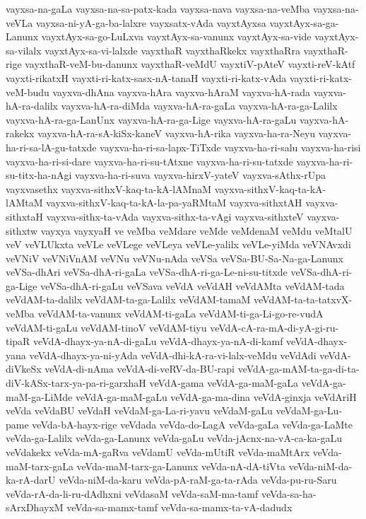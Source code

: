 {vayxsa-na-gaLa
vayxsa-na-sa-patx-kada
vayxsa-nava
vayxsa-na-veMba
vayxsa-na-veVLa
vayxsa-ni-yA-ga-ba-lalxre
vayxsatx-vAda
vayxtAyxsa
vayxtAyx-sa-ga-Lanunx
vayxtAyx-sa-go-LuLxva
vayxtAyx-sa-vanunx
vayxtAyx-sa-vide
vayxtAyx-sa-vilalx
vayxtAyx-sa-vi-lalxde
vayxthaR
vayxthaRkekx
vayxthaRra
vayxthaR-rige
vayxthaR-veM-bu-danunx
vayxthaR-veMdU
vayxtiV-pAteV
vayxti-reV-kAtf
vayxti-rikatxH
vayxti-ri-katx-sasx-nA-tanaH
vayxti-ri-katx-vAda
vayxti-ri-katx-veM-budu
vayxva-dhAna
vayxva-hAra
vayxva-hAraM
vayxva-hA-rada
vayxva-hA-ra-dalilx
vayxva-hA-ra-diMda
vayxva-hA-ra-gaLa
vayxva-hA-ra-ga-Lalilx
vayxva-hA-ra-ga-LanUnx
vayxva-hA-ra-ga-Lige
vayxva-hA-ra-gaLu
vayxva-hA-rakekx
vayxva-hA-ra-sA-kiSx-kaneV
vayxva-hA-rika
vayxva-ha-ra-Neyu
vayxva-ha-ri-sa-lA-gu-tatxde
vayxva-ha-ri-sa-lapx-TiTxde
vayxva-ha-ri-salu
vayxva-ha-risi
vayxva-ha-ri-si-dare
vayxva-ha-ri-su-tAtxne
vayxva-ha-ri-su-tatxde
vayxva-ha-ri-su-titx-ha-nAgi
vayxva-ha-ri-suva
vayxva-hirxV-yateV
vayxva-sAthx-rUpa
vayxvasethx
vayxva-sithxV-kaq-ta-kA-lAMnaM
vayxva-sithxV-kaq-ta-kA-lAMtaM
vayxva-sithxV-kaq-ta-kA-la-pa-yaRMtaM
vayxva-sithxtAH
vayxva-sithxtaH
vayxva-sithx-ta-vAda
vayxva-sithx-ta-vAgi
vayxva-sithxteV
vayxva-sithxtw
vayxya
vayxyaH
ve
veMba
veMdare
veMde
veMdenaM
veMdu
veMtalU
veV
veVLUkxta
veVLe
veVLege
veVLeya
veVLe-yalilx
veVLe-yiMda
veVNAvxdi
veVNiV
veVNiVnAM
veVNu
veVNu-nAda
veVSa
veVSa-BU-Sa-Na-ga-Lanunx
veVSa-dhAri
veVSa-dhA-ri-gaLa
veVSa-dhA-ri-ga-Le-ni-su-titxde
veVSa-dhA-ri-ga-Lige
veVSa-dhA-ri-gaLu
veVSava
veVdA
veVdAH
veVdAMta
veVdAM-tada
veVdAM-ta-dalilx
veVdAM-ta-ga-Lalilx
veVdAM-tamaM
veVdAM-ta-ta-tatxvX-veMba
veVdAM-ta-vanunx
veVdAM-ti-gaLa
veVdAM-ti-ga-Li-go-re-vudA
veVdAM-ti-gaLu
veVdAM-tinoV
veVdAM-tiyu
veVdA-cA-ra-mA-di-yA-gi-ru-tipaR
veVdA-dhayx-ya-nA-di-gaLu
veVdA-dhayx-ya-nA-di-kamf
veVdA-dhayx-yana
veVdA-dhayx-ya-ni-yAda
veVdA-dhi-kA-ra-vi-lalx-veMdu
veVdAdi
veVdA-diVkeSx
veVdA-di-nAma
veVdA-di-veRV-da-BU-rapi
veVdA-ga-mAM-ta-ga-di-ta-diV-kASx-tarx-ya-pa-ri-garxhaH
veVdA-gama
veVdA-ga-maM-gaLa
veVdA-ga-maM-ga-LiMde
veVdA-ga-maM-gaLu
veVdA-ga-ma-dina
veVdA-ginxja
veVdAriH
veVda
veVdaBU
veVdaH
veVdaM-ga-La-ri-yavu
veVdaM-gaLu
veVdaM-ga-Lu-pame
veVda-bA-hayx-rige
veVdada
veVda-do-LagA
veVda-gaLa
veVda-ga-LaMte
veVda-ga-Lalilx
veVda-ga-Lanunx
veVda-gaLu
veVda-jAcnx-na-vA-ca-ka-gaLu
veVdakekx
veVda-mA-gaRva
veVdamU
veVda-mUtiR
veVda-maMtArx
veVda-maM-tarx-gaLa
veVda-maM-tarx-ga-Lanunx
veVda-nA-dA-tiVta
veVda-niM-da-ka-rA-darU
veVda-niM-da-karu
veVda-pA-raM-ga-ta-rAda
veVda-pu-ru-Saru
veVda-rA-da-li-ru-dAdhxni
veVdasaM
veVda-saM-ma-tamf
veVda-sa-ha-sArxDhayxM
veVda-sa-mamx-tamf
veVda-sa-mamx-ta-vA-dadudx
}
